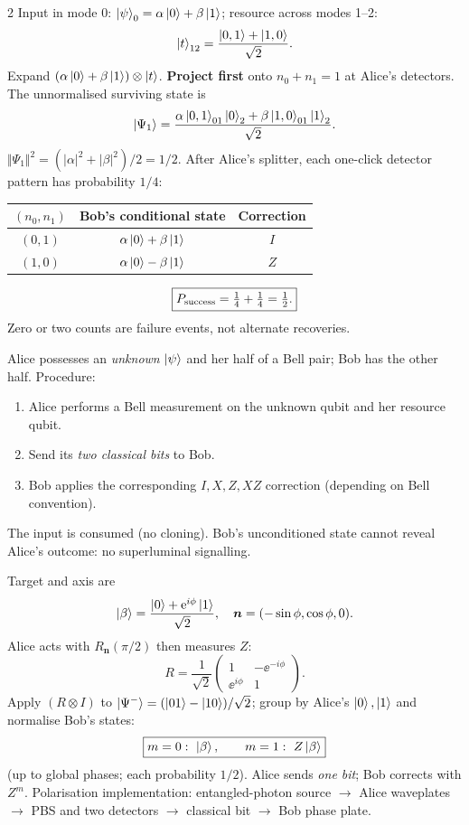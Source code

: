 \begin{multicols}{2}
Input in mode 0: $\left\lvert \psi\right\rangle_0=\alpha\left\lvert 0\right\rangle+\beta\left\lvert 1\right\rangle$; resource across modes 1--2:
\[\left\lvert t\right\rangle_{12}=\frac{\left\lvert 0,1\right\rangle+\left\lvert 1,0\right\rangle}{\sqrt2}.\]
Expand $(\alpha\left\lvert 0\right\rangle+\beta\left\lvert 1\right\rangle)\otimes\left\lvert t\right\rangle$. \textbf{Project first} onto $n_0+n_1=1$ at Alice's detectors. The unnormalised surviving state is
\[\left\lvert \Psi_1\right\rangle=\frac{\alpha\left\lvert 0,1\right\rangle_{01}\left\lvert 0\right\rangle_2+\beta\left\lvert 1,0\right\rangle_{01}\left\lvert 1\right\rangle_2}{\sqrt2}.\]
$\Vert\Psi_1\Vert^2=(|\alpha|^2+|\beta|^2)/2=1/2$. After Alice's splitter, each one-click detector pattern has probability $1/4$:
\begin{center}\footnotesize
\begin{tabular}{@{}ccc@{}}\toprule
$(n_0,n_1)$&Bob's conditional state&Correction\\\midrule
$(0,1)$&$\alpha\left\lvert 0\right\rangle+\beta\left\lvert 1\right\rangle$&$I$\\
$(1,0)$&$\alpha\left\lvert 0\right\rangle-\beta\left\lvert 1\right\rangle$&$Z$\\
\bottomrule\end{tabular}
\end{center}
\[\boxed{P_{\rm success}=\tfrac14+\tfrac14=\tfrac12.}\]
Zero or two counts are failure events, not alternate recoveries.

\columnbreak
{}
Alice possesses an \emph{unknown} $\left\lvert \psi\right\rangle$ and her half of a Bell pair; Bob has the other half. Procedure:
\begin{enumerate}
\item Alice performs a Bell measurement on the unknown qubit and her resource qubit.
\item Send its \emph{two classical bits} to Bob.
\item Bob applies the corresponding $I,X,Z,XZ$ correction (depending on Bell convention).
\end{enumerate}
The input is consumed (no cloning). Bob's unconditioned state cannot reveal Alice's outcome: no superluminal signalling.

Target and axis are
\[\left\lvert \beta\right\rangle=\frac{\left\lvert 0\right\rangle+\mathrm e^{i\phi}\left\lvert 1\right\rangle}{\sqrt2},\quad \bm n=(-\sin\phi,\cos\phi,0).\]
Alice acts with $R_{\bm n}(\pi/2)$ then measures $Z$:
\[R=\frac1{\sqrt2}\begin{pmatrix}1&-\ee^{-i\phi}\\\ee^{i\phi}&1\end{pmatrix}.\]
Apply $(R\otimes I)$ to $\left\lvert \Psi^-\right\rangle=(\left\lvert 01\right\rangle-\left\lvert 10\right\rangle)/\sqrt2$; group by Alice's $\left\lvert 0\right\rangle,\left\lvert 1\right\rangle$ and normalise Bob's states:
\[\boxed{m=0:\ \ket\beta,\qquad m=1:\ Z\ket\beta}\]
(up to global phases; each probability $1/2$). Alice sends \emph{one bit}; Bob corrects with $Z^m$. Polarisation implementation: entangled-photon source $\to$ Alice waveplates $\to$ PBS and two detectors $\to$ classical bit $\to$ Bob phase plate.


\end{multicols}
